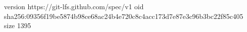 version https://git-lfs.github.com/spec/v1
oid sha256:09356f19be5874b98ce68ac24b4e720c8c4acc173d7e87e3c96b3bc22f85c405
size 1395
